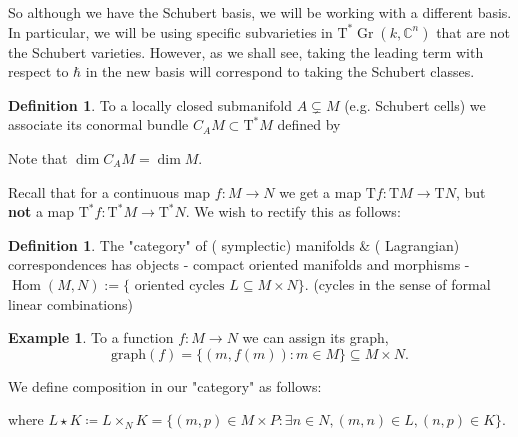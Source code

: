\documentclass[12pt]{amsart}
\numberwithin{equation}{section}
\theoremstyle{definition}
\newtheorem{Example}[equation]{Example}
\newtheorem{Definition}[equation]{Definition}
\numberwithin{figure}{section}
\newcommand{\C}{\mathbb{C}}
\newcommand{\Hom}{\operatorname{Hom}}
\newcommand{\on}[1]{\operatorname{#1}}
\newcommand{\Gr}{\on{Gr}}
\begin{document}
So although we have the Schubert basis, we will be working with a different basis.
In particular, we will be using specific subvarieties in $\text{T}^* \Gr(k,\C^n)$ that are not the Schubert varieties. However, as we shall see, taking the leading term with respect to $\hbar$ in the new basis will correspond to taking the Schubert classes.

\begin{Definition}
	To a locally closed submanifold $A \subsetneq M$ (e.g. Schubert cells) we associate its conormal bundle $C_A M \subset \text{T}^* M$ defined by

	\begin{center}
	\end{center}
\end{Definition}

Note that $\dim C_A M = \dim M$.

Recall that for a continuous map $f: M\to N$ we get a map $\text{T} f : \text{T} M \to \text{T} N$, but \textbf{not} a map $\text{T}^* f : \text{T}^* M \to \text{T}^* N$. We wish to rectify this as follows:
\begin{Definition}
	The "category" of ({\color{red} symplectic}) manifolds \& ({\color{red} Lagrangian}) correspondences has objects - compact oriented manifolds and  morphisms - $\Hom(M,N) := \{ \text{ oriented cycles } L\subseteq M \times N\}$.
	(cycles in the sense of formal linear combinations)
\end{Definition}

\begin{Example}
	To a function $f:M \to N$ we can assign its graph,
	\[ \text{graph}(f) = \{(m, f(m)) : m \in M\} \subseteq M \times N.
	\]
\end{Example}

We define composition in our "category" as follows:

\begin{center}
\end{center}
where $L\star K \coloneqq L \times_N K = \{ (m,p) \in M\times P: \exists n\in N, (m, n) \in L, (n,p) \in K\}$.
\end{document}
